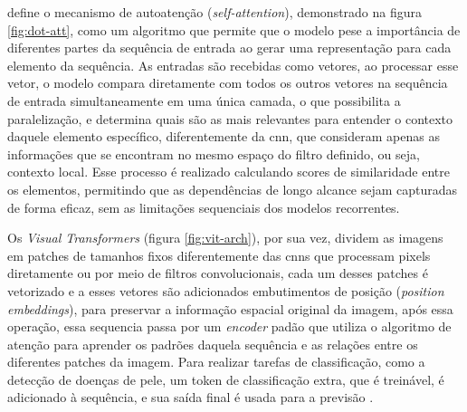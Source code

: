  define o mecanismo de autoatenção (\textit{self-attention}), demonstrado na figura \ref{fig:dot-att}, como um algoritmo que permite que o modelo pese a importância de diferentes partes da sequência de entrada ao gerar uma representação para cada elemento da sequência. As entradas são recebidas como vetores, ao processar esse vetor, o modelo compara diretamente com todos os outros vetores na sequência de entrada simultaneamente em uma única camada, o que possibilita a paralelização, e determina quais são as mais relevantes para entender o contexto daquele elemento específico, diferentemente da \gls{cnn}, que consideram apenas as informações que se encontram no mesmo espaço do filtro definido, ou seja, contexto local. 
 Esse processo é realizado calculando scores de similaridade entre os elementos, permitindo que as dependências de longo alcance sejam capturadas de forma eficaz, sem as limitações sequenciais dos modelos recorrentes.

%
  
Os \textit{Visual Transformers} (figura \ref{fig:vit-arch}), por sua vez, dividem as imagens em patches de tamanhos fixos diferentemente das \gls{cnn}s que processam pixels diretamente ou por meio de filtros convolucionais, cada um desses patches é vetorizado e a esses vetores são adicionados embutimentos de posição (\textit{position embeddings}), para preservar a informação espacial original da imagem, após essa operação, essa sequencia passa por um \textit{encoder} padão que utiliza o algoritmo de atenção para aprender os padrões daquela sequência e as relações entre os diferentes patches da imagem. Para realizar tarefas de classificação, como a detecção de doenças de pele, um token de classificação extra, que é treinável, é adicionado à sequência, e sua saída final é usada para a previsão \cite{Dosovitskiy}.
\newline
\newline
\newline

